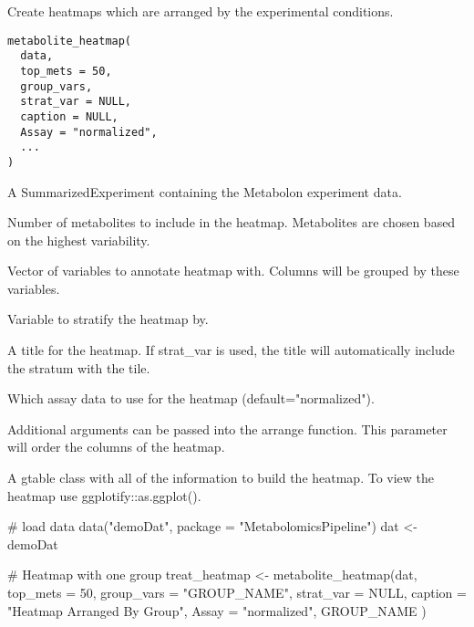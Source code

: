 \documentclass[a4paper]{book}
\begin{document}
%
\begin{Description}
Create heatmaps which are arranged by the experimental conditions.
\end{Description}
%
\begin{Usage}
\begin{verbatim}
metabolite_heatmap(
  data,
  top_mets = 50,
  group_vars,
  strat_var = NULL,
  caption = NULL,
  Assay = "normalized",
  ...
)
\end{verbatim}
\end{Usage}
%
\begin{Arguments}
\begin{ldescription}
\item[\code{data}] A SummarizedExperiment containing the Metabolon experiment data.

\item[\code{top\_mets}] Number of metabolites to include in the heatmap. Metabolites
are chosen based on the highest variability.

\item[\code{group\_vars}] Vector of variables to annotate heatmap with. Columns will
be grouped by these variables.

\item[\code{strat\_var}] Variable to stratify the heatmap by.

\item[\code{caption}] A title for the heatmap. If strat\_var is used, the title will
automatically include the stratum with the tile.

\item[\code{Assay}] Which assay data to use for the heatmap (default="normalized").

\item[\code{...}] Additional arguments can be passed into the arrange function.
This parameter will order the columns of the heatmap.
\end{ldescription}
\end{Arguments}
%
\begin{Value}
A gtable class with all of the information to build the heatmap.
To view the heatmap use ggplotify::as.ggplot().
\end{Value}
%
\begin{Examples}
\begin{ExampleCode}
# load data
data("demoDat", package = "MetabolomicsPipeline")
dat <- demoDat

# Heatmap with one group
treat_heatmap <- metabolite_heatmap(dat,
    top_mets = 50,
    group_vars = "GROUP_NAME",
    strat_var = NULL,
    caption = "Heatmap Arranged By Group",
    Assay = "normalized",
    GROUP_NAME
)

\end{ExampleCode}
\end{Examples}
\end{document}
